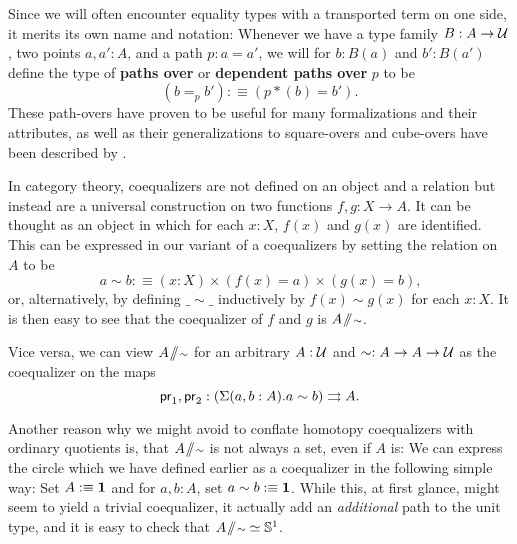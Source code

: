 \begin{remark}[Pathovers]
Since we will often encounter equality types with a transported term on one
side, it merits its own name and notation:
Whenever we have a type family $B : A \to \mathcal{U}$, two points $a, a' : A$,
and a path $p : a = a'$, we will for $b : B(a)$ and $b' : B(a')$ define the
type of
\textbf{paths over} or \textbf{dependent paths over} $p$ to be
\begin{equation*}
(b =_p b') :\equiv (p*(b) = b') \text{.}
\end{equation*}
These path-overs have proven to be useful for many formalizations and their
attributes, as well as their generalizations to square-overs and
cube-overs have been described by \cite{licatacubical}.
\end{remark}

\begin{remark}
In category theory, coequalizers are not defined on an object and a relation
but instead are a universal construction on two functions $f, g : X \to A$.
It can be thought as an object in which for each $x : X$, $f(x)$ and $g(x)$ are identified.
This can be expressed in our variant of a coequalizers by setting the relation
on $A$ to be
\begin{equation*}
a \sim b :\equiv (x : X) \times (f(x) = a) \times (g(x) = b) \text{,}
\end{equation*}
or, alternatively, by defining $\_\sim\_$ inductively by $f(x) \sim g(x)$ for each
$x : X$.
It is then easy to see that the coequalizer of $f$ and $g$ is $A \! \sslash \! {\scriptstyle \sim}$.

Vice versa, we can view $A \! \sslash \! {\scriptstyle \sim}$ for an arbitrary $A : \mathcal{U}$ and
$\sim : A \to A \to \mathcal{U}$ as the coequalizer on the maps
\begin{equation*}
 \mathsf{pr}_1,\mathsf{pr}_2 : \left(\Sigma(a,b : A).a \sim b\right) \rightrightarrows A \text{.}
\end{equation*}
\end{remark}

Another reason why we might avoid to conflate homotopy coequalizers with
ordinary quotients is, that $A \! \sslash \! {\scriptstyle \sim}$ is not always a set, even if $A$ is:
We can express the circle which we have defined earlier as a coequalizer
in the following simple way:
Set $A :\equiv \mathbf{1}$ and for $a , b : A$, set $a \sim b :\equiv \mathbf{1}$.
While this, at first glance, might seem to yield a trivial coequalizer,
it actually add an \emph{additional} path to the unit type, and
it is easy to check that $A \! \sslash \! {\scriptstyle \sim} \simeq \mathbb{S}^1$.


